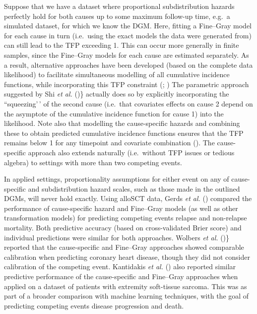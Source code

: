 \documentclass[
  letterpaper,
  DIV=11,
  numbers=noendperiod]{scrreprt}
\begin{document}
Suppose that we have a dataset where proportional subdistribution
hazards perfectly hold for both causes up to some maximum follow-up
time, e.g.~a simulated dataset, for which we know the DGM. Here, fitting
a Fine--Gray model for each cause in turn (i.e.~using the exact models
the data were generated from) can still lead to the TFP exceeding 1.
This can occur more generally in finite samples, since the Fine--Gray
models for each cause are estimated separately. As a result, alternative
approaches have been developed (based on the complete data likelihood)
to facilitate simultaneous modelling of all cumulative incidence
functions, while incorporating this TFP constraint
(; ) The parametric approach suggested by Shi \emph{et al.}
()\} actually does
so by explicitly incorporating the ``squeezing'\,' of the second cause
(i.e.~that covariates effects on cause 2 depend on the asymptote of the
cumulative incidence function for cause 1) into the likelihood. Note
also that modelling the cause-specific hazards and combining these to
obtain predicted cumulative incidence functions ensures that the TFP
remains below 1 for any timepoint and covariate combination
(). The cause-specific approach also extends naturally
(i.e.~without TFP issues or tedious algebra) to settings with more than
two competing events.

In applied settings, proportionality assumptions for either event on any
of cause-specific and subdistribution hazard scales, such as those made
in the outlined DGMs, will never hold exactly. Using alloSCT data, Gerds
\emph{et al.} ()
compared the performance of cause-specific hazard and Fine--Gray models
(as well as other transformation models) for predicting competing events
relapse and non-relapse mortality. Both predictive accuracy (based on
cross-validated Brier score) and individual predictions were similar for
both approaches. Wolbers \emph{et al.}
()\} reported
that the cause-specific and Fine--Gray approaches showed comparable
calibration when predicting coronary heart disease, though they did not
consider calibration of the competing event. Kantidakis \emph{et al.}
() also
reported similar predictive performance of the cause-specific and
Fine--Gray approaches when applied on a dataset of patients with
extremity soft-tissue sarcoma. This was as part of a broader comparison
with machine learning techniques, with the goal of predicting competing
events disease progression and death.
\end{document}
